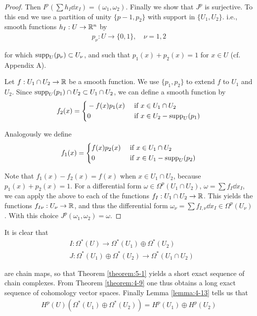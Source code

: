 \begin{proof}
  Then  $I^p(\sum h_I\dd x_I) = (\omega_1, \omega_2)$. Finally we show that $J^p$ is surjective. To this end we use 
  a partition of unity $\{p-1, p_2\}$ with support in $\{U_1, U_2\}$. i.e., smooth functions $h_I:U\to \mathbb{R}^n$ by 
  \begin{align*}
    p_\nu: U\to \{0, 1\}, \quad \nu = 1, 2
  \end{align*}

  for which $\mathrm{supp}_U(p_\nu)\subset U_\nu$, and such that $p_1(x) + p_2(x) = 1$ for $x\in U$ (cf.
  Appendix A).

  Let $f:U_1\cap U_2\to\mathbb{R}$ be a smooth function. We use $\{p_1, p_2\}$ to extend $f$ to $U_1$ and
  $U_2$. Since $\mathrm{supp}_U(p_1)\cap U_2\subset U_1\cap U_2$, we can define a smooth function by
  \begin{align*}
    f_2(x) = \left\{\begin{aligned}
      & -f(x)p_1(x) && \text{ if } x\in U_1\cap U_2 \\
      & 0 && \text{ if } x\in U_2 - \mathrm{supp}_U(p_1) 
    \end{aligned}\right.
  \end{align*}

  Analogously we define 
  \begin{align*}
    f_1(x) = \left\{\begin{aligned}
      & f(x)p_2(x) && \text{ if } x\in U_1\cap U_2 \\
      & 0 && \text{ if } x\in U_1 - \mathrm{supp}_U(p_2) 
    \end{aligned}\right.
  \end{align*}

  Note that $f_1(x) - f_2(x) = f(x)$ when $x\in U_1\cap U_2$, because $p_1(x) + p_2(x) = 1$.
  For a differential form $\omega\in \Omega^p(U_1\cap U_2)$, $\omega = \sum f_I\dd x_I$, we can apply 
  the above to each of the functions $f_I:U_1\cap U_2\to\mathbb{R}$. This yields the functions $f_{I\nu}:U_\nu\to\mathbb{R}$,
  and thus the differential form $\omega_\nu = \sum f_{I, \nu}\dd x_I\in\Omega^p(U_\nu)$. With this choice $J^p(\omega_1, \omega_2) 
  = \omega$. 
\end{proof}

It is clear that
\begin{align*}
  & I{:}\Omega^{*}(U)\to\Omega^{*}(U_{1})\oplus\Omega^{*}(U_{2})\\
  & J{:}\Omega^{*}(U_{1})\oplus\Omega^{*}(U_{2})\to\Omega^{*}(U_{1}\cap U_{2})
\end{align*}

are chain maps, so that Theorem \ref{theorem:5-1} yields a short exact sequence of chain
complexes. From Theorem \ref{theorem:4-9} one thus obtains a long exact sequence of
cohomology vector spaces. Finally Lemma \ref{lemma:4-13} tells us that
\begin{align*}
  H^p(U)(\Omega^*(U_1)\oplus\Omega^*(U_2)) = H^p(U_1)\oplus H^p(U_2)
\end{align*}

